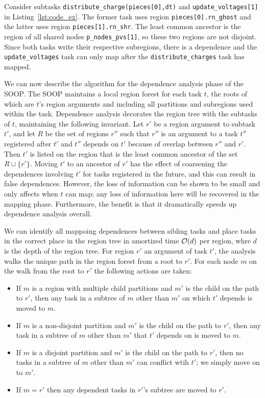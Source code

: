 Consider subtasks {\tt distribute\_charge(pieces[0],dt)} and
{\tt update\_voltages[1]} in Listing~\ref{lst:code_ex}.  The former task
uses region {\tt pieces[0].rn\_ghost} and the latter uses region {\tt pieces[1].rn\_shr}.
The least common ancestor is the region of all shared nodes {\tt p\_nodes\_pvs[1]},
so these two regions are not disjoint.  Since both tasks write their respective subregions,
there is a dependence and the {\tt update\_voltages} task can only map after the
{\tt distribute\_charges} task has mapped.

We can now describe the algorithm for the dependence analysis phase of
the SOOP.  The SOOP maintains a local region forest for each task $t$,
the roots of which are $t$'s region arguments and including all
partitions and subregions used within the task.  Dependence analysis
decorates the region tree with the subtasks of $t$, maintaining the
following invariant. Let $r'$ be a region argument to subtask $t'$,
and let $R$ be the set of regions $r''$ such that $r''$ is an argument
to a task $t''$ registered after $t'$ and $t''$ depends on $t'$
because of overlap between $r''$ and $r'$.  Then $t'$ is listed on the
region that is the least common ancestor of the set $R \cup \{r'\}$.
Moving $t'$ to an ancestor of $r'$ has the effect of coarsening the
dependences involving $t'$ for tasks registered in the future, and
this can result in false dependences.  However, the loss of
information can be shown to be small and only affects when $t$ can
map; any loss of information here will be recovered in the mapping
phase.  Furthermore, the benefit is that it dramatically speeds up
dependence analysis overall.

We can identify all mappoing dependences between sibling tasks and place tasks
in the correct place in the region tree in amortized time ${\cal O}(d)$ per region,
whre $d$ is the depth of the region tree.  For region $r'$ an argument of task $t'$, the analysis
walks the unique path in the region forest from a root to $r'$.  For each node $m$
on the walk from the root to $r'$ the following actions are taken:
\begin{itemize}
\item If $m$ is a region with multiple child partitions and $m'$ is the child on the
path to $r'$, then any task in a subtree of $m$ other than $m'$ on which $t'$ depends 
is moved to $m$.

\item If $m$ is a non-disjoint partition and $m'$ is the child on the
path to $r'$, then any task in a subtree of $m$ other than $m'$ that $t'$ depends on is
moved to $m$.

\item If $m$ is a disjoint partition and $m'$ is the child on the
path to $r'$, then no tasks in a subtree of $m$ other than $m'$ can conflict wtih $t'$; we simply move
on to $m'$.

\item If $m = r'$ then any dependent tasks in $r'$'s subtree are moved to $r'$.
\end{itemize}

